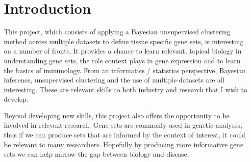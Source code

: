 \documentclass[12pt]{article} %
\begin{document}
	
	\section{Introduction}
	This project, which consists of applying a Bayesian unsupervised clustering method across multiple datasets to define tissue specific gene sets, is interesting on a number of fronts. It provides a chance to learn relevant, topical biology in understanding gene sets, the role context plays in gene expression and to learn the basics of immunology. From an informatics / statistics perspective, Bayesian inference, unsupervised clustering and the use of multiple datasets are all interesting. These are relevant skills to both industry and research that I wish to develop.
	
	Beyond developing new skills, this project also offers the opportunity to be involved in relevant research. Gene sets are commonly used in genetic analyses, thus if we can produce sets that are informed by the context of interest, it could be relevant to many researchers. Hopefully by producing more informative gene sets we can help narrow the gap between biology and disease.	
\end{document}
